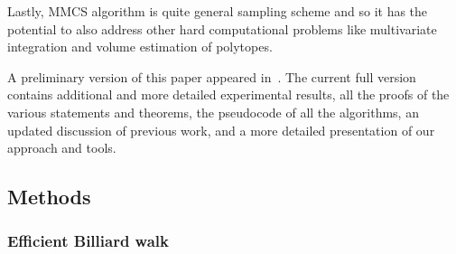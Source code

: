    Lastly, MMCS algorithm is quite general sampling scheme and so it has the potential 
   to also address other hard computational problems like multivariate integration 
   and volume estimation of polytopes. 

   A preliminary version of this paper appeared in~\cite{chalki2021SoCG}. 
   The current full version contains additional and more detailed experimental results, all the proofs of the various statements and theorems, the pseudocode of all the algorithms, an updated discussion of previous work,
   and a more detailed presentation of our approach and tools.






\subsection{Methods}


\subsubsection*{Efficient Billiard walk}

